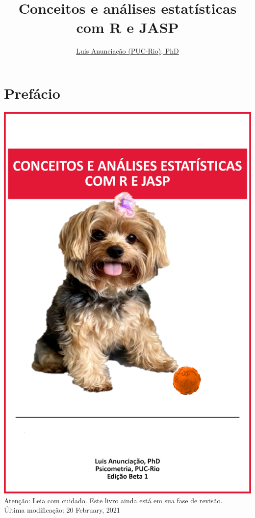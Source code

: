 \documentclass[
]{book}
\title{Conceitos e análises estatísticas com R e JASP}
\author{\href{mailto:\%20luisfca@puc-rio.br}{Luis Anunciação (PUC-Rio), PhD}}
\date{}
\newenvironment{Shaded}{\begin{snugshade}}{\end{snugshade}}
\newcommand{\DataTypeTok}[1]{\textcolor[rgb]{0.13,0.29,0.53}{#1}}
\newcommand{\KeywordTok}[1]{\textcolor[rgb]{0.13,0.29,0.53}{\textbf{#1}}}
\newcommand{\NormalTok}[1]{#1}
\newcommand{\OperatorTok}[1]{\textcolor[rgb]{0.81,0.36,0.00}{\textbf{#1}}}
\newcommand{\OtherTok}[1]{\textcolor[rgb]{0.56,0.35,0.01}{#1}}
\newcommand{\StringTok}[1]{\textcolor[rgb]{0.31,0.60,0.02}{#1}}
\begin{document}
\maketitle

{
\setcounter{tocdepth}{1}
\tableofcontents
}
\begin{Shaded}
\end{Shaded}

\hypertarget{prefuxe1cio}{%
\chapter{Prefácio}\label{prefuxe1cio}}

\includegraphics{./img/capa_jolie.png}
Atenção: Leia com cuidado. Este livro ainda está em sua fase de revisão.\\
Última modificação: 20 February, 2021
\end{document}
